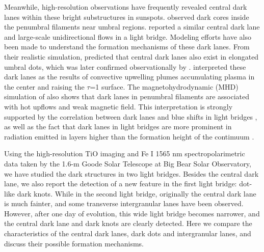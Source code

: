 \documentclass[preprint2]{aastex}
\begin{document}
Meanwhile, high-resolution observations have frequently revealed central dark lanes within these bright substructures in sunspots. \cite{Scharmer2002} observed dark cores inside the penumbral filaments near umbral regions. \cite{BergerandandBerdyugina2003} reported a similar central dark lane and large-scale unidirectional flows in a light bridge. Modeling efforts have also been made to understand the formation mechanisms of these dark lanes. From their realistic simulation, \cite{SchusslerandVolger} predicted that central dark lanes also exist in elongated umbral dots, which was later confirmed observationally by \cite{Bharti2007}. \cite{SchusslerandVolger} interpreted these dark lanes as the results of convective upwelling plumes accumulating plasma in the center and raising the $\tau$=1 surface. The magnetohydrodynamic (MHD) simulation of \cite{Heinemann2007} also shows that dark lanes in penumbral filaments are associated with hot upflows and weak magnetic field. This interpretation is strongly supported by the correlation between dark lanes and blue shifts in light bridges \citep{Giordano2008,Rouppe2010}, as well as the fact that dark lanes in light bridges are more prominent in radiation emitted in layers higher than the formation height of the contimuum \citep{Rimmele2008}.

Using the high-resolution TiO imaging and Fe I 1565 nm spectropolarimetric data taken by the 1.6-m Goode Solar Telescope \citep[GST,][]{Cao2010,Cao2012} at Big Bear Solar Observatory, we have studied the dark structures in two light bridges. Besides the central dark lane, we also report the detection of a new feature in the first light bridge: dot-like dark knots. While in the second light bridge, originally the central dark lane is much fainter, and some transverse intergranular lanes have been observed. However, after one day of evolution, this wide light bridge becomes narrower, and the central dark lane and dark knots are clearly detected. Here we compare the characteristics of the central dark lanes, dark dots and intergranular lanes, and discuss their possible formation mechanisms.
\end{document}
